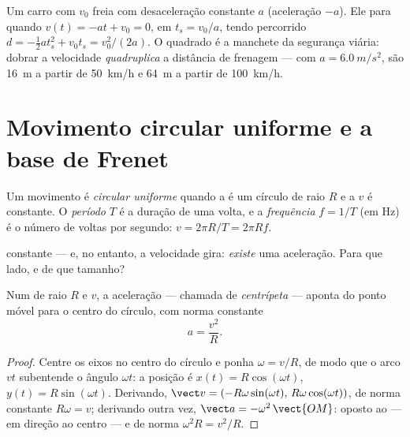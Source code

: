\begin{example}\label{ex:g12:kinematics-2d:braking}
Um carro com  $v_0$ freia com desaceleração constante
$a$ (aceleração $-a$). Ele para quando $v(t) = -a t + v_0 = 0$, em
$t_s = v_0/a$, tendo percorrido
$d = -\tfrac12 a t_s^2 + v_0 t_s = v_0^2/(2a)$. O quadrado é a manchete
da segurança viária: dobrar a velocidade \emph{quadruplica} a distância
de frenagem --- com $a = \qty{6.0}{m/s^2}$, são \qty{16}{m} a partir de
\qty{50}{km/h} e \qty{64}{m} a partir de \qty{100}{km/h}.
\end{example}

\section{Movimento circular uniforme e a base de Frenet}

\begin{definition}\label{def:g12:kinematics-2d:ucm}
Um movimento é \emph{circular uniforme} quando a  é um círculo de raio $R$ e a  $v$ é constante. O \emph{período} $T$ é
a duração de uma volta, e a \emph{frequência} $f = 1/T$ (em \unit{Hz}) é o número de voltas por segundo:
$v = 2\pi R/T = 2\pi R f$.
\end{definition}

 constante --- e, no entanto, a velocidade gira:
\emph{existe} uma aceleração. Para que lado, e de que tamanho?

\begin{theorem}\label{thm:g12:kinematics-2d:centripetal}
%
Num  de raio $R$ e  $v$, a
aceleração --- chamada de \emph{centrípeta} --- aponta do ponto móvel
para o centro do círculo, com norma constante
\[
a = \frac{v^2}{R}.
\]
\end{theorem}

\begin{proof}
Centre os eixos no centro do círculo e ponha $\omega = v/R$, de modo que
o arco $v t$ subentende o ângulo $\omega t$: a posição é
$x(t) = R\cos(\omega t)$, $y(t) = R\sin(\omega t)$. Derivando,
$\vect v = (-R\omega\sin(\omega t),\, R\omega\cos(\omega t))$, de norma
constante $R\omega = v$; derivando outra vez,
$\vect a = -\omega^2\,\vect{OM}$: oposto ao  --- em direção
ao centro --- e de norma $\omega^2 R = v^2/R$.
\end{proof}

